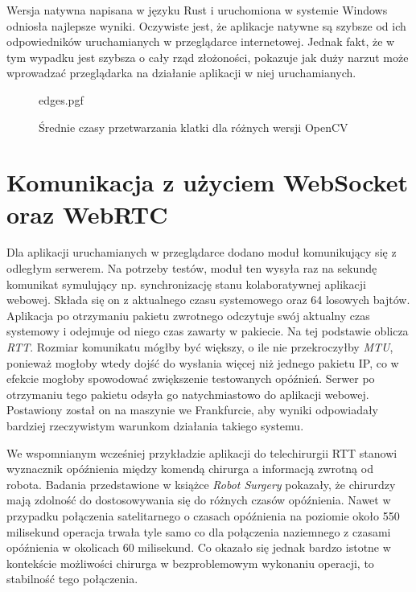 \documentclass[language=polish,type=master]{aghmodern}
\begin{document}
Wersja natywna napisana w języku Rust i uruchomiona w systemie Windows odniosła najlepsze wyniki.
Oczywiste jest, że aplikacje natywne są szybsze od ich odpowiedników uruchamianych w przeglądarce internetowej.
Jednak fakt, że w tym wypadku jest szybsza o cały rząd złożoności, pokazuje jak duży narzut może wprowadzać przeglądarka na działanie aplikacji w niej uruchamianych.

\begin{figure}[H]
    \centering
    {edges.pgf}
    \caption{Średnie czasy przetwarzania klatki dla różnych wersji OpenCV}
    \label{fig:edges}
\end{figure}

\section{Komunikacja z użyciem WebSocket oraz WebRTC}
Dla aplikacji uruchamianych w przeglądarce dodano moduł komunikujący się z odległym serwerem.
Na potrzeby testów, moduł ten wysyła raz na sekundę komunikat symulujący np. synchronizację stanu kolaboratywnej aplikacji webowej.
Składa się on z aktualnego czasu systemowego oraz 64 losowych bajtów.
Aplikacja po otrzymaniu pakietu zwrotnego odczytuje swój aktualny czas systemowy i odejmuje od niego czas zawarty w pakiecie.
Na tej podstawie oblicza \emph{RTT}\footnotemark{}.
Rozmiar komunikatu mógłby być większy, o ile nie przekroczyłby \emph{MTU}\footnotemark{}, ponieważ mogłoby wtedy dojść do wysłania więcej niż jednego pakietu IP, co w efekcie mogłoby spowodować zwiększenie testowanych opóźnień.
Serwer po otrzymaniu tego pakietu odsyła go natychmiastowo do aplikacji webowej.
Postawiony został on na maszynie we Frankfurcie, aby wyniki odpowiadały bardziej rzeczywistym warunkom działania takiego systemu.

We wspomnianym wcześniej przykładzie aplikacji do telechirurgii RTT stanowi wyznacznik opóźnienia między komendą chirurga a informacją zwrotną od robota.
Badania przedstawione w książce \emph{Robot Surgery} \cite{telesurgery} pokazały, że chirurdzy mają zdolność do dostosowywania się do różnych czasów opóźnienia.
Nawet w przypadku połączenia satelitarnego o czasach opóźnienia na poziomie około 550 milisekund operacja trwała tyle samo co dla połączenia naziemnego z czasami opóźnienia w okolicach 60 milisekund.
Co okazało się jednak bardzo istotne w kontekście możliwości chirurga w bezproblemowym wykonaniu operacji, to stabilność tego połączenia.
\end{document}
